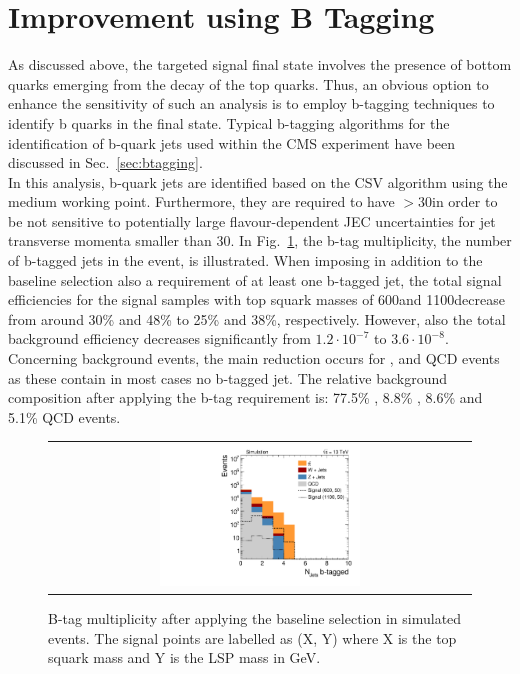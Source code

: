 \section{Improvement using B Tagging}
\label{sec:stop_btagging}
As discussed above, the targeted signal final state involves the presence of bottom quarks emerging from the decay of the top quarks. Thus, an obvious option to enhance the sensitivity of such an analysis is to employ b-tagging techniques to identify b quarks in the final state. Typical b-tagging algorithms for the identification of b-quark jets used within the CMS experiment have been discussed in Sec.~\ref{sec:btagging}. \\
In this analysis, b-quark jets are identified based on the CSV algorithm using the medium working point. Furthermore, they are required to have \pt$> 30$\gev in order to be not sensitive to potentially large flavour-dependent JEC uncertainties for jet transverse momenta smaller than 30\gev. In Fig.~\ref{fig:stop_baseline_btag}, the b-tag multiplicity, \ie the number of b-tagged jets in the event, is illustrated.  %
When imposing in addition to the baseline selection also a requirement of at least one b-tagged jet, the total signal efficiencies for the signal samples with top squark masses of 600\gev and 1100\gev decrease from around 30\% and 48\% to 25\% and 38\%, respectively. However, also the total background efficiency decreases significantly from $1.2 \cdot 10^{-7}$ to $3.6 \cdot 10^{-8}$. Concerning background events, the main reduction occurs for \WJets, \ZJets and QCD events as these contain in most cases no b-tagged jet. The relative background composition after applying the b-tag requirement is: 77.5\% \ttbar, 8.8\% \WJets, 8.6\% \ZJets and 5.1\% QCD events.        
\begin{figure}[!t]
  \centering
  \begin{tabular}{c}
                \includegraphics[width=0.49\textwidth]{figures/Stop_DeltaPhiSelection_N_jets_btagged.pdf}%
  \end{tabular}
  \caption{B-tag multiplicity after applying the baseline selection in simulated events. The signal points are labelled as (X, Y) where X is the top squark mass and Y is the LSP mass in GeV.}
  \label{fig:stop_baseline_btag}
\end{figure}

